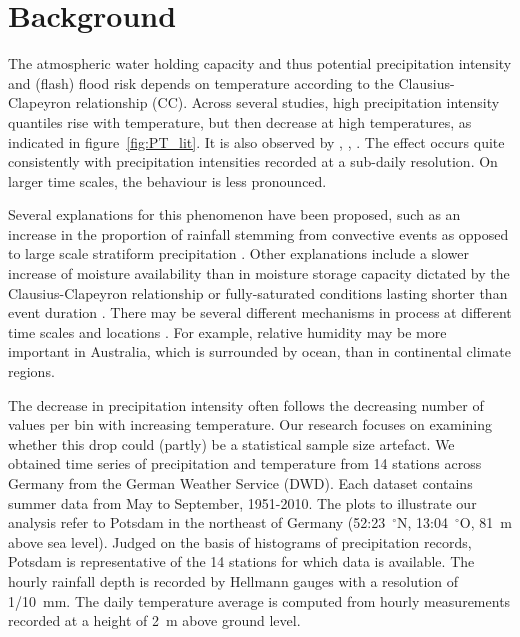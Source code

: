 \documentclass[a4paper]{article}
\begin{document}
\section{Background} %
\label{sec:background}
\begin{multicols}{2}

The atmospheric water holding capacity and thus potential precipitation intensity and (flash) flood risk depends on temperature according to the Clausius-Clapeyron relationship (CC). 
Across several studies, high precipitation intensity quantiles rise with temperature, but then decrease at high temperatures, as indicated in figure~\ref{fig:PT_lit}.
It is also observed by \citet{brandsma_statistical_1997}, \citet{klein_tank_dependence_1993},  \citet{panthou_relationship_2014}.
The effect occurs quite consistently with precipitation intensities recorded at a sub-daily resolution.
On larger time scales, the behaviour is less pronounced.

Several explanations for this phenomenon have been proposed, such as an increase in the proportion of rainfall stemming from convective events as opposed to large scale stratiform precipitation \citep{haerter_unexpected_2009}. Other explanations include a slower increase of moisture availability than in moisture storage capacity dictated by the Clausius-Clapeyron relationship \citep{berg_seasonal_2009} or fully-saturated conditions lasting shorter than event duration \citep{hardwick_jones_observed_2010}. 
There may be several different mechanisms in process at different time scales and locations \citep{utsumi_does_2011}.
For example, relative humidity may be more important in Australia, which is surrounded by ocean, than in continental climate regions.

The decrease in precipitation intensity often follows the decreasing number of values per bin with increasing temperature.
Our research focuses on examining whether this drop could (partly) be a statistical sample size artefact. 
We obtained time series of precipitation and temperature from 14 stations across Germany from the German Weather Service (DWD).
Each dataset contains summer data from May to September, 1951-2010.
The plots to illustrate our analysis refer to Potsdam in the northeast of Germany (52:23~$^{\circ}$N,  13:04~$^{\circ}$O,  81~m above sea level).
Judged on the basis of histograms of precipitation records, Potsdam is representative of the 14 stations for which data is available.
The hourly rainfall depth is recorded by Hellmann gauges with a resolution of 1/10~mm.
The daily temperature average is computed from hourly measurements recorded at a height of 2~m above ground level.
\end{multicols}
\end{document}
